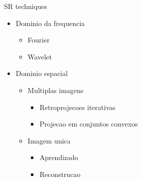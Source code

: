 ﻿\documentclass[mathserif]{beamer}
\begin{document}
	
	\begin{frame}{SR techniques}		
	    \begin{itemize}
	        \item Dominio da frequencia
	        \begin{itemize}
	            \item Fourier
	            \item Wavelet
	        \end{itemize}
	        \item Dominio espacial
	        \begin{itemize}
	            \item Multiplas imagens
	            \begin{itemize}
	                \item Retroprojecoes iterativas
	                \item Projecao em conjuntos convexos
	            \end{itemize}
	            
	            \item Imagem unica
	            \begin{itemize}
	                \item Aprendizado
	                \item Reconstrucao
	            \end{itemize}
	        \end{itemize}	        
	    \end{itemize} 
	\end{frame}
	
	

	
\end{document}
